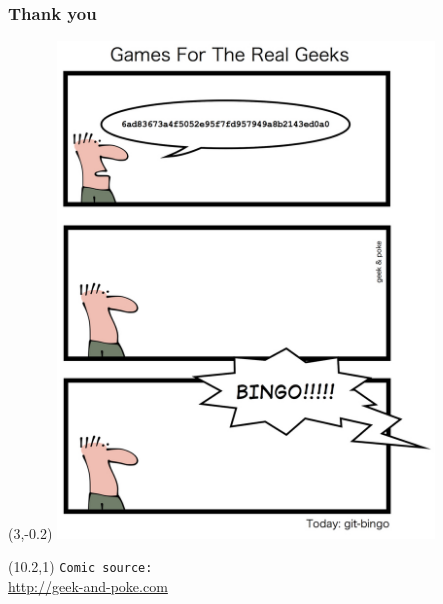 \documentclass[handout,notes]{gittalk}
\begin{document}
\begin{frame}
\frametitle{Thank you}
\begin{textblock}{10}(3,-0.2)
  \includegraphics[width=0.75\textwidth]{./img/git-bingo.jpg}
\end{textblock}
\begin{textblock}{6}(10.2,1)
  \footnotesize
  \texttt{Comic source:}\\
  \url{http://geek-and-poke.com}
\end{textblock}
\end{frame}

\end{document}
